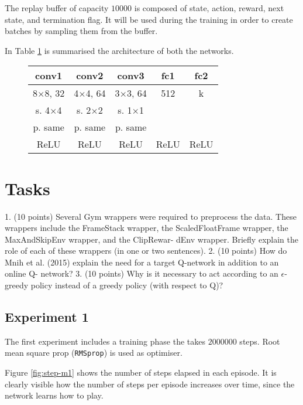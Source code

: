 \documentclass[a4paper,12pt]{article} %
\begin{document}
	The replay buffer of capacity $10000$ is composed of state, action, reward, next state, and termination flag. It will be used during the training in order to create batches by sampling them from the buffer.
	
	In Table \ref{tab:arc} is summarised the architecture of both the networks. 
	
	\begin{figure}[htb]
		\centering
		
		\begin{tabular}{ccccc}
			\toprule
			\textbf{conv1} & \textbf{conv2} & \textbf{conv3} & \textbf{fc1} &
			\textbf{fc2} \\
			\midrule
			8$\times$8,  32 & 4$\times$4, 64 & 3$\times$3, 64 & 512 & k\\
			s. 4$\times$4 &   s. 2$\times$2 &   s. 1$\times$1 &  & \\
			p. same & p. same & p. same &&\\
			ReLU & ReLU & ReLU & ReLU & ReLU  \\
			\bottomrule
		\end{tabular}
		\label{tab:arc}
	\end{figure}
	
	
	\section{Tasks}
	\label{section:tasks}
	1. (10 points) Several Gym wrappers were required to preprocess the data. These wrappers include the FrameStack wrapper, the ScaledFloatFrame wrapper, the MaxAndSkipEnv wrapper, and the ClipRewar- dEnv wrapper. Briefly explain the role of each of these wrappers (in one or two sentences).
	2. (10 points) How do Mnih et al. (2015) explain the need for a target Q-network in addition to an online Q- network?
	3. (10 points) Why is it necessary to act according to an $\epsilon$-greedy policy instead of a greedy policy (with respect to Q)?
	
	\subsection{Experiment 1}
	The first experiment includes a training phase the takes $2000000$ steps. 
	Root mean square prop (\texttt{RMSprop}) is used as optimiser.
	
	Figure \ref{fig:step-m1} shows the number of steps elapsed in each episode.
	It is clearly visible how the number of steps per episode increases over time, since the network learns how to play.
\end{document}
